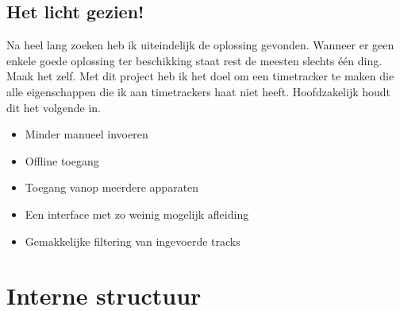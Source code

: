 \documentclass[a4paper,11pt]{article}
\begin{document}
\subsection{Het licht gezien!}
Na heel lang zoeken heb ik uiteindelijk de oplossing gevonden. Wanneer er geen
enkele goede oplossing ter beschikking staat rest de meesten slechts één ding.
Maak het zelf. Met dit project heb ik het doel om een timetracker te maken die
alle eigenschappen die ik aan timetrackers haat niet heeft. Hoofdzakelijk houdt
dit het volgende in.
\begin{itemize}
  \item Minder manueel invoeren
  \item Offline toegang
  \item Toegang vanop meerdere apparaten
  \item Een interface met zo weinig mogelijk afleiding
  \item Gemakkelijke filtering van ingevoerde tracks
\end{itemize}

\section{Interne structuur}
\end{document}
